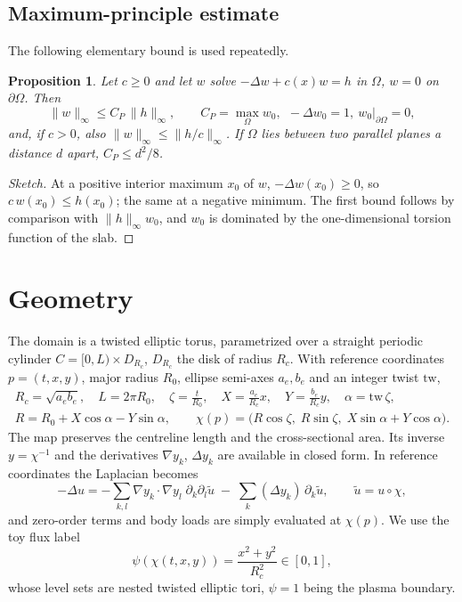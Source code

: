 \documentclass[11pt,a4paper]{article}
\newtheorem{proposition}{Proposition}
\theoremstyle{remark}\newtheorem{remark}{Remark}
\begin{document}
\subsection{Maximum-principle estimate}
The following elementary bound is used repeatedly.
\begin{proposition}\label{prop:maxp}
Let $c\ge0$ and let $w$ solve $-\Delta w+c(x)w=h$ in $\Omega$, $w=0$ on $\partial\Omega$. Then
\[
\|w\|_\infty\le C_P\,\|h\|_\infty,\qquad C_P=\max_\Omega w_0,\ \ -\Delta w_0=1,\ w_0|_{\partial\Omega}=0,
\]
and, if $c>0$, also $\|w\|_\infty\le\|h/c\|_\infty$. If $\Omega$ lies between
two parallel planes a distance $d$ apart, $C_P\le d^2/8$.
\end{proposition}
\begin{proof}[Sketch]
At a positive interior maximum $x_0$ of $w$, $-\Delta w(x_0)\ge0$, so
$c\,w(x_0)\le h(x_0)$; the same at a negative minimum. The first bound follows
by comparison with $\|h\|_\infty w_0$, and $w_0$ is dominated by the
one-dimensional torsion function of the slab.
\end{proof}

\section{Geometry}
The domain is a twisted elliptic torus, parametrized over a straight periodic
cylinder $C=[0,L)\times D_{R_c}$, $D_{R_c}$ the disk of radius $R_c$. With
reference coordinates $p=(t,x,y)$, major radius $R_0$, ellipse semi-axes
$a_e,b_e$ and an integer twist $\mathrm{tw}$,
\begin{equation}
\begin{gathered}
  R_c=\sqrt{a_eb_e},\quad L=2\pi R_0,\quad \zeta=\frac{t}{R_0},\quad
  X=\frac{a_e}{R_c}x,\quad Y=\frac{b_e}{R_c}y,\quad \alpha=\mathrm{tw}\,\zeta,\\
  R=R_0+X\cos\alpha-Y\sin\alpha,\qquad
  \chi(p)=\big(R\cos\zeta,\;R\sin\zeta,\;X\sin\alpha+Y\cos\alpha\big).
\end{gathered}
\end{equation}
The map preserves the centreline length and the cross-sectional area. Its
inverse $y=\chi^{-1}$ and the derivatives $\nabla y_k$, $\Delta y_k$ are
available in closed form. In reference coordinates the Laplacian becomes
\begin{equation}
  -\Delta u = -\sum_{k,l}\nabla y_k\!\cdot\!\nabla y_l\;\partial_k\partial_l\tilde u
  \;-\;\sum_k(\Delta y_k)\,\partial_k\tilde u,\qquad \tilde u=u\circ\chi,
\end{equation}
and zero-order terms and body loads are simply evaluated at $\chi(p)$. We use
the toy flux label
\begin{equation}
  \psi(\chi(t,x,y))=\frac{x^2+y^2}{R_c^2}\in[0,1],
\end{equation}
whose level sets are nested twisted elliptic tori, $\psi=1$ being the plasma
boundary.
\end{document}
